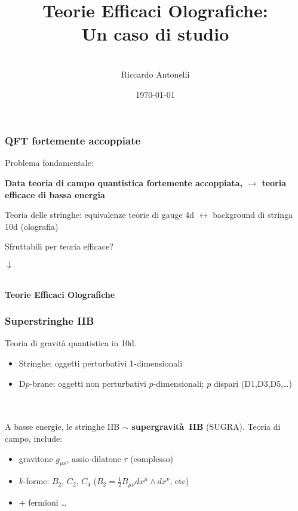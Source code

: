 \documentclass[aspectratio=43,mathserif]{beamer}
\title{Teorie Efficaci Olografiche:\\ Un caso di studio}
\author{\vspace{10pt}\\\large Riccardo Antonelli }
\date{\today}
\begin{document}
\begin{frame}
	\maketitle
\end{frame}

\begin{frame}
	\frametitle{QFT fortemente accoppiate}
	Problema fondamentale:
	\begin{center}\textbf{
		Data teoria di campo quantistica fortemente accoppiata, $\longrightarrow$ teoria efficace di bassa energia}
	\end{center}

	\vfill Teoria delle stringhe: equivalenze teorie di gauge 4d $\leftrightarrow$ background di stringa 10d (olografia)

	\vfill Sfruttabili per teoria efficace?

	\begin{center} $\downarrow$

		~\\

		\textbf{Teorie Efficaci Olografiche}
	\end{center}



\end{frame}

\begin{frame}
	\frametitle{Superstringhe IIB}
	Teoria di gravità quantistica in 10d.

	\begin{itemize}
		\item Stringhe: oggetti perturbativi 1-dimensionali
		\item D$p$-brane: oggetti non perturbativi $p$-dimensionali; $p$ dispari (D1,D3,D5,\ldots)
	\end{itemize}

	~\\~\\

	A basse energie, le stringhe IIB $\sim$ \textbf{supergravità~IIB} (SUGRA). Teoria di campo, include:

	\begin{itemize}
		\item gravitone $g_{\mu\nu}$, assio-dilatone $\tau$ (complesso)
		\item $k$-forme: $B_2$, $C_2$, $C_4$ \quad \quad (${\scriptstyle B_2 = \frac{1}{2} B_{\mu\nu} dx^\mu \wedge dx^\nu}$, etc)
		\item + fermioni \ldots
	\end{itemize}
\end{frame}
\end{document}
